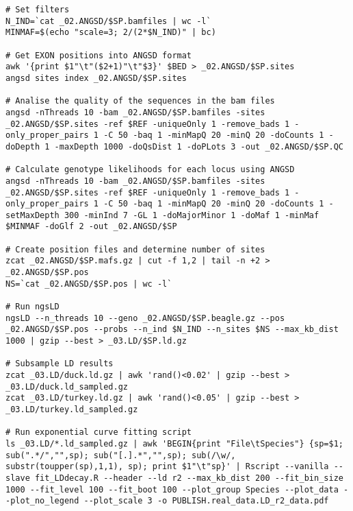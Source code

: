 \documentclass[a4paper]{article}
\begin{document}
\begin{lstlisting}
# Set filters
N_IND=`cat _02.ANGSD/$SP.bamfiles | wc -l`
MINMAF=$(echo "scale=3; 2/(2*$N_IND)" | bc)

# Get EXON positions into ANGSD format
awk '{print $1"\t"($2+1)"\t"$3}' $BED > _02.ANGSD/$SP.sites
angsd sites index _02.ANGSD/$SP.sites

# Analise the quality of the sequences in the bam files
angsd -nThreads 10 -bam _02.ANGSD/$SP.bamfiles -sites _02.ANGSD/$SP.sites -ref $REF -uniqueOnly 1 -remove_bads 1 -only_proper_pairs 1 -C 50 -baq 1 -minMapQ 20 -minQ 20 -doCounts 1 -doDepth 1 -maxDepth 1000 -doQsDist 1 -doPLots 3 -out _02.ANGSD/$SP.QC

# Calculate genotype likelihoods for each locus using ANGSD
angsd -nThreads 10 -bam _02.ANGSD/$SP.bamfiles -sites _02.ANGSD/$SP.sites -ref $REF -uniqueOnly 1 -remove_bads 1 -only_proper_pairs 1 -C 50 -baq 1 -minMapQ 20 -minQ 20 -doCounts 1 -setMaxDepth 300 -minInd 7 -GL 1 -doMajorMinor 1 -doMaf 1 -minMaf $MINMAF -doGlf 2 -out _02.ANGSD/$SP

# Create position files and determine number of sites
zcat _02.ANGSD/$SP.mafs.gz | cut -f 1,2 | tail -n +2 > _02.ANGSD/$SP.pos
NS=`cat _02.ANGSD/$SP.pos | wc -l`

# Run ngsLD                                                                                                                                                                                                                                                                
ngsLD --n_threads 10 --geno _02.ANGSD/$SP.beagle.gz --pos _02.ANGSD/$SP.pos --probs --n_ind $N_IND --n_sites $NS --max_kb_dist 1000 | gzip --best > _03.LD/$SP.ld.gz

# Subsample LD results
zcat _03.LD/duck.ld.gz | awk 'rand()<0.02' | gzip --best > _03.LD/duck.ld_sampled.gz
zcat _03.LD/turkey.ld.gz | awk 'rand()<0.05' | gzip --best > _03.LD/turkey.ld_sampled.gz

# Run exponential curve fitting script
ls _03.LD/*.ld_sampled.gz | awk 'BEGIN{print "File\tSpecies"} {sp=$1; sub(".*/","",sp); sub("[.].*","",sp); sub(/\w/, substr(toupper(sp),1,1), sp); print $1"\t"sp}' | Rscript --vanilla --slave fit_LDdecay.R --header --ld r2 --max_kb_dist 200 --fit_bin_size 1000 --fit_level 100 --fit_boot 100 --plot_group Species --plot_data --plot_no_legend --plot_scale 3 -o PUBLISH.real_data.LD_r2_data.pdf


\end{lstlisting}



\end{document}
